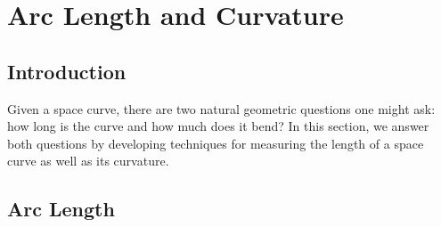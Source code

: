 \section{Arc Length and Curvature} \label{S:9.8.Arc_Length_Curvature}

\vspace*{-14 pt}


\subsection*{Introduction}

Given a space curve, there are two natural
geometric questions one might ask: how long is the curve and how much
does it bend?  In this section, we answer both questions by
developing techniques for measuring the length of a space
curve as well as its curvature.



\subsection*{Arc Length}

